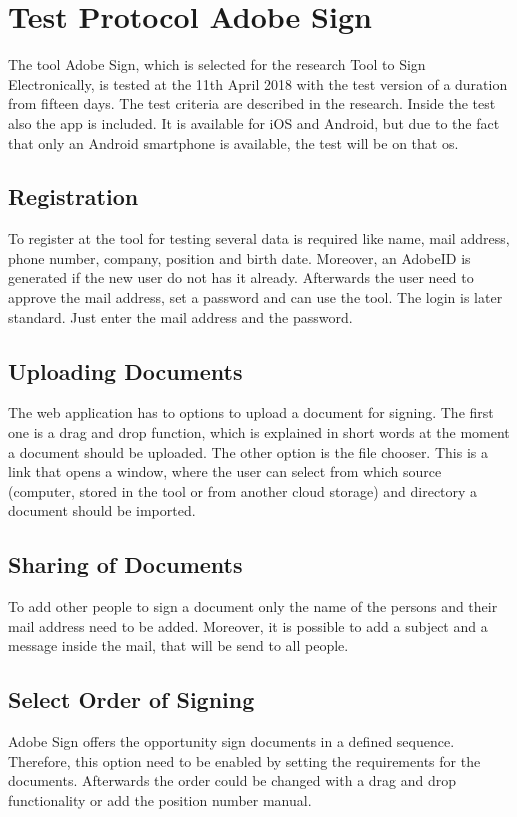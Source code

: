 \section{Test Protocol Adobe Sign}
The tool Adobe Sign, which is selected for the research Tool to Sign Electronically, is tested at the 11th April 2018 with the test version of a duration from fifteen days. The test criteria are described in the research. Inside the test also the \gls{app} is included. It is available for iOS and Android, but due to the fact that only an Android smartphone is available, the test will be on that \gls{os}.

\subsection{Registration}
To register at the tool for testing several data is required like name, mail address, phone number, company, position and birth date. Moreover, an AdobeID is generated if the new user do not has it already. Afterwards the user need to approve the mail address, set a password and can use the tool. The login is later standard. Just enter the mail address and the password.

\subsection{Uploading Documents}
The web application has to options to upload a document for signing. The first one is a drag and drop function, which is explained in short words at the moment a document should be uploaded. The other option is the file chooser. This is a link that opens a window, where the user can select from which source (computer, stored in the tool or from another cloud storage) and directory a document should be imported.

\subsection{Sharing of Documents}
To add other people to sign a document only the name of the persons and their mail address need to be added. Moreover, it is possible to add a subject and a message inside the mail, that will be send to all people.

\subsection{Select Order of Signing}
Adobe Sign offers the opportunity sign documents in a defined sequence. Therefore, this option need to be enabled by setting the requirements for the documents. Afterwards the order could be changed with a drag and drop functionality or add the position number manual.

